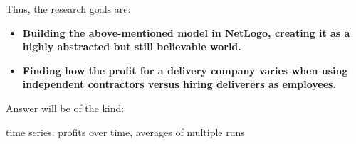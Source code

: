 Thus, the research goals are:
\begin{itemize}
 \item \textbf{Building the above-mentioned model in NetLogo, creating it as a highly abstracted but still believable world.}
 \item \textbf{Finding how the profit for a delivery company varies when using independent contractors versus hiring deliverers as employees.}
\end{itemize}

Answer will be of the kind:

time series: profits over time, averages of multiple runs


